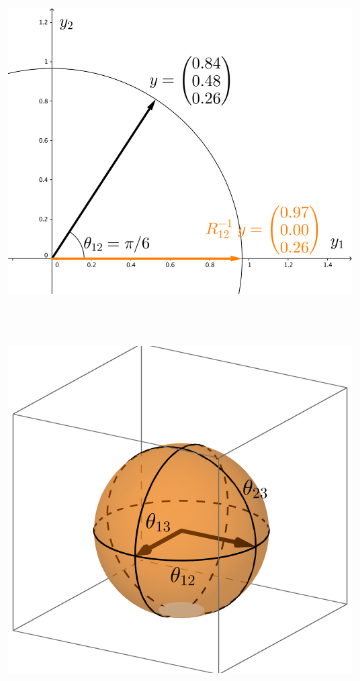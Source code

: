 \documentclass{article}
\begin{document}
\begin{figure}
    \centering
    \begin{subfigure}[b]{0.3\textwidth}
        \includegraphics[width=\textwidth]{GivensReduction.png}
        \caption{}
        \label{fig:MleSubspaceEstimate}
    \end{subfigure}
    ~ %
    \begin{subfigure}[b]{0.3\textwidth}
        \includegraphics[width=\textwidth]{StiefelGeom.png}

\end{subfigure}
\end{figure}
\end{document}
